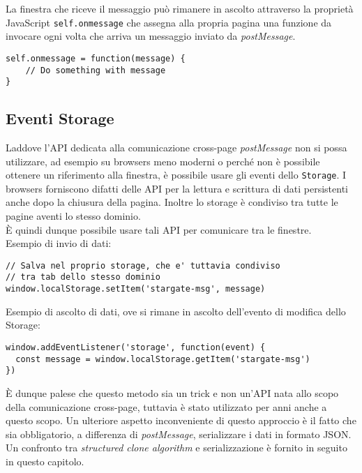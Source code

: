 La finestra che riceve il messaggio può rimanere in ascolto attraverso la proprietà JavaScript \texttt{self.onmessage} che assegna alla propria pagina una funzione da invocare ogni volta che arriva un messaggio inviato da \textit{postMessage}.

\begin{lstlisting}[language={[Sharp]C}]
self.onmessage = function(message) {
    // Do something with message
}
\end{lstlisting}

\subsection{Eventi Storage}

Laddove l'API dedicata alla comunicazione cross-page \textit{postMessage} non si possa utilizzare, ad esempio su browsers meno moderni o perché non è possibile ottenere un riferimento alla finestra, è possibile usare gli eventi dello \texttt{Storage}. I browsers forniscono difatti delle API per la lettura e scrittura di dati persistenti anche dopo la chiusura della pagina. Inoltre lo storage è condiviso tra tutte le pagine aventi lo stesso dominio. \\

È quindi dunque possibile usare tali API per comunicare tra le finestre. \\

Esempio di invio di dati:

\begin{lstlisting}[language={[Sharp]C}]
// Salva nel proprio storage, che e' tuttavia condiviso
// tra tab dello stesso dominio
window.localStorage.setItem('stargate-msg', message)
\end{lstlisting}

Esempio di ascolto di dati, ove si rimane in ascolto dell'evento di modifica dello Storage:

\begin{lstlisting}[language={[Sharp]C}]
window.addEventListener('storage', function(event) {
  const message = window.localStorage.getItem('stargate-msg')
})
\end{lstlisting}

È dunque palese che questo metodo sia un trick e non un'API nata allo scopo della comunicazione cross-page, tuttavia è stato utilizzato per anni anche a questo scopo. Un ulteriore aspetto inconveniente di questo approccio è il fatto che sia obbligatorio, a differenza di \textit{postMessage}, serializzare i dati in formato \gls{JSON}. Un confronto tra \textit{structured clone algorithm} e serializzazione è fornito in seguito in questo capitolo.

